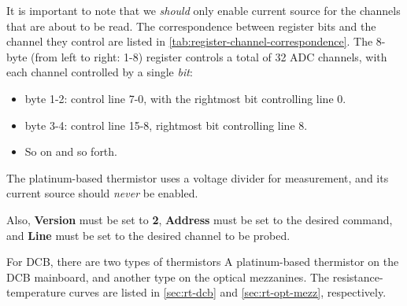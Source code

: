 It is important to note that we \emph{should} only enable current source for the
channels that are about to be read.
The correspondence between register bits and the channel they control are listed
in \autoref{tab:register-channel-correspondence}.
The 8-byte (from left to right: 1-8) register controls a total of 32 ADC
channels, with each channel controlled by a single \emph{bit}:

\begin{itemize}
    \item byte 1-2: control line 7-0, with the rightmost bit controlling line 0.
    \item byte 3-4: control line 15-8, rightmost bit controlling line 8.
    \item So on and so forth.
\end{itemize}

The platinum-based thermistor uses a voltage divider for measurement, and its
current source should \emph{never} be enabled.

Also, \textbf{Version} must be set to \textbf{2}, \textbf{Address} must be set
to the desired command, and \textbf{Line} must be set to the desired channel to
be probed.

For DCB, there are two types of thermistors A platinum-based thermistor on the
DCB mainboard, and another type on the optical mezzanines.
The resistance-temperature curves are listed in \autoref{sec:rt-dcb}
and \autoref{sec:rt-opt-mezz}, respectively.
